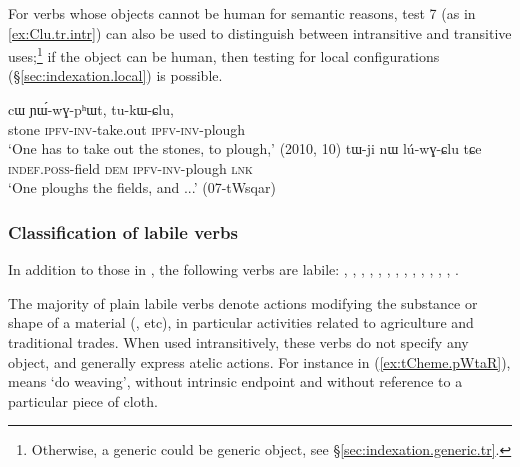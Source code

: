 For verbs whose objects cannot be human for semantic reasons, test 7 (as in \ref{ex:Clu.tr.intr})  can also be used to distinguish between intransitive and transitive uses;\footnote{Otherwise, a generic  could be generic object, see §\ref{sec:indexation.generic.tr}.} if the object can be human, then testing for local configurations (§\ref{sec:indexation.local}) is possible.

\begin{exe}
\ex \label{ex:Clu.tr.intr}
\begin{xlist}
\ex  \label{ex:tukWClu}
\gll cɯ ɲɯ́-wɣ-pʰɯt, tu-kɯ-ɕlu, \\
stone \textsc{ipfv}-\textsc{inv}-take.out \textsc{ipfv}-\textsc{inv}-plough \\
\glt  `One has to take out the stones, to plough,' (2010, 10)
\ex  \label{ex:luwGClu}
\gll tɯ-ji nɯ lú-wɣ-ɕlu tɕe \\
\textsc{indef}.\textsc{poss}-field \textsc{dem} \textsc{ipfv}-\textsc{inv}-plough \textsc{lnk} \\
\glt  `One ploughs the fields, and ...' (07-tWsqar)
\end{xlist}
\end{exe}

\subsubsection{Classification of labile verbs} \label{sec:lability.categories}
In addition to those in , the following verbs are labile: , , , , , , , , ,  , , , , . 

 
The majority of plain labile verbs denote actions modifying the substance or shape of a material (,  etc), in particular activities related to agriculture and traditional trades. When used intransitively, these verbs do not specify any object, and generally express atelic actions. For instance in (\ref{ex:tCheme.pWtaR}),  means `do weaving', without intrinsic endpoint and without reference to a particular piece of cloth.

